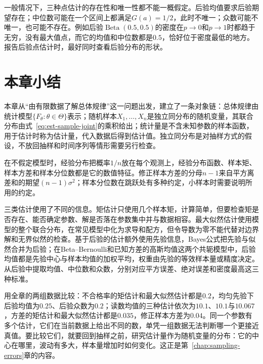 一般情况下，三种点估计的存在性和唯一性都不能一概假定。后验均值要求后验期望存在；中位数可能在一个区间上都满足$G(a)=1/2$，此时不唯一；众数可能不唯一，也可能不存在。例如后验$\operatorname{Beta}(0.5,0.5)$的密度在$p\to0$和$p\to1$时都趋于无穷，没有最大值点，而它的均值和中位数都是$0.5$，恰好位于密度最低的地方。报告后验点估计时，最好同时查看后验分布的形状。

\section{本章小结}
\label{sec:est-summary}

本章从“由有限数据了解总体规律”这一问题出发，建立了一条对象链：总体规律由统计模型$\{F_\theta:\theta\in\Theta\}$表示；随机样本$X_1,\dots,X_n$是独立同分布的随机变量，其联合分布由式~\eqref{eq:est-sample-joint}的乘积给出；统计量是不含未知参数的样本函数，用于估计时称为估计量，代入数据后得到估计值。独立同分布是对抽样方式的假设，不放回抽样和时间序列等情形需要另行检查。

在不假定模型时，经验分布把概率$1/n$放在每个观测上，经验分布函数、样本矩、样本方差和样本分位数都是它的数值特征。修正样本方差的分母$n-1$来自平方离差和的期望$(n-1)\sigma^2$；样本分位数在跳跃处有多种约定，小样本时需要说明所用的约定。

三类估计使用了不同的信息。矩估计只使用几个样本矩，计算简单，但要检查矩是否存在、能否确定参数、解是否落在参数集中并与数据相容。最大似然估计使用模型的整个联合分布，在常见模型中化为求导和配方，但令导数为零不能代替对边界解和无界似然的检查。基于后验的估计额外使用先验信息，Bayes公式把先验与似然合并为后验；在Beta--Bernoulli和已知方差的高斯均值这两个共轭模型中，后验均值都是先验中心与样本均值的加权平均，权重由先验的等效样本量或精度决定。从后验中提取均值、中位数和众数，分别对应平方误差、绝对误差和密度最高这三种标准。

用全章的两组数据比较：不合格率的矩估计和最大似然估计都是$0.2$，均匀先验下后验均值为$0.25$、后验众数为$0.2$；读数均值的三种估计依次为$10.1$、$10.1$与$10.067$，方差的矩估计和最大似然估计都是$0.035$，修正样本方差为$0.04$。同一个参数有多个估计，它们在当前数据上给出不同的数，单凭一组数据无法判断哪一个更接近真值。要比较它们，就要回到抽样之前，研究估计量作为随机变量的分布：它的中心在哪里，波动有多大，样本量增加时如何变化。这正是第~\ref{chap:sampling-errors}章的内容。
